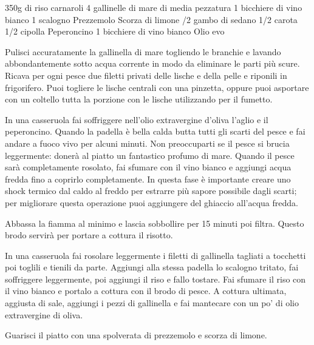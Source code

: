 \begin{ingreds}
	350g di riso carnaroli
	4 gallinelle di mare di media pezzatura
	1 bicchiere di vino bianco
	1 scalogno
	Prezzemolo
	Scorza di limone
\columnbreak
{}/2 gambo di sedano
	1/2 carota
	1/2 cipolla
	Peperoncino
	1 bicchiere di vino bianco
	Olio evo 

\end{ingreds}

\begin{method}
	Pulisci accuratamente la gallinella di mare togliendo le branchie e lavando abbondantemente sotto acqua corrente in modo da eliminare le parti più scure. Ricava per ogni pesce due filetti privati delle lische e della pelle e riponili in frigorifero. Puoi togliere le lische centrali con una pinzetta, oppure puoi  asportare con un coltello tutta la porzione con le lische utilizzando per il fumetto.

	In una casseruola fai soffriggere nell'olio extravergine d’oliva l'aglio e il peperoncino. Quando la padella è bella calda butta tutti gli scarti del pesce e fai andare a fuoco vivo per alcuni minuti. Non preoccuparti se il pesce si brucia leggermente: donerà al piatto un fantastico profumo di mare. Quando il pesce sarà completamente rosolato, fai sfumare con il vino bianco e aggiungi acqua fredda fino a coprirlo completamente. In questa fase è importante creare uno shock termico dal caldo al freddo per estrarre più sapore possibile dagli scarti; per migliorare questa operazione puoi aggiungere del ghiaccio all'acqua fredda.
	
	Abbassa la fiamma al minimo e lascia sobbollire per 15 minuti poi filtra. Questo brodo servirà per portare a cottura il risotto.

	In una casseruola fai rosolare leggermente i filetti di gallinella tagliati a tocchetti poi toglili e tienili da parte. Aggiungi alla stessa padella lo scalogno tritato, fai soffriggere leggermente, poi aggiungi il riso e fallo tostare. Fai sfumare il riso con il vino bianco e portalo a cottura con il brodo di pesce. A cottura ultimata, aggiusta di sale, aggiungi i pezzi di gallinella e fai mantecare con un po’ di olio extravergine di oliva.

	Guarisci il piatto con una spolverata di prezzemolo e scorza di limone.

\end {method}

